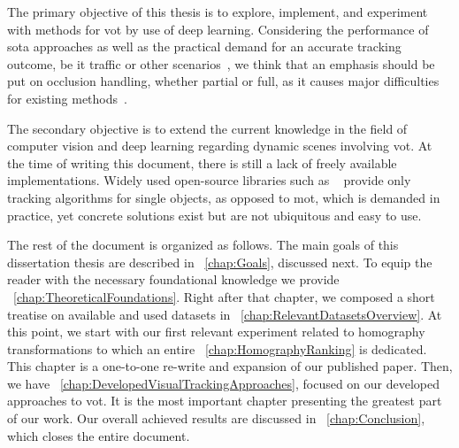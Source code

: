 The primary objective of this thesis is to explore, implement, and experiment with methods for \gls{vot} by use of deep learning. Considering the performance of \gls{sota} approaches as well as the practical demand for an accurate tracking outcome, be it traffic or other scenarios~\cite{tang2019cityflow}, we think that an emphasis should be put on occlusion handling, whether partial or full, as it causes major difficulties for existing methods~\cite{jiyan2007robustocclusion}.

The secondary objective is to extend the current knowledge in the field of computer vision and deep learning regarding dynamic scenes involving \gls{vot}. At the time of writing this document, there is still a lack of freely available implementations. Widely used open-source libraries such as \opencv{}~\cite{bradski2000opencv} provide only tracking algorithms for single objects, as opposed to \gls{mot}, which is demanded in practice, yet concrete solutions exist but are not ubiquitous and easy to use.

The rest of the document is organized as follows. The main goals of this dissertation thesis are described in \chaptertext{}~\ref{chap:Goals}, discussed next. To equip the reader with the necessary foundational knowledge we provide \chaptertext{}~\ref{chap:TheoreticalFoundations}. Right after that chapter, we composed a short treatise on available and used datasets in \chaptertext{}~\ref{chap:RelevantDatasetsOverview}. At this point, we start with our first relevant experiment related to homography transformations to which an entire \chaptertext{}~\ref{chap:HomographyRanking} is dedicated. This chapter is a one-to-one re-write and expansion of our published paper. Then, we have \chaptertext{}~\ref{chap:DevelopedVisualTrackingApproaches}, focused on our developed approaches to \gls{vot}. It is the most important chapter presenting the greatest part of our work. Our overall achieved results are discussed in \chaptertext{}~\ref{chap:Conclusion}, which closes the entire document.
